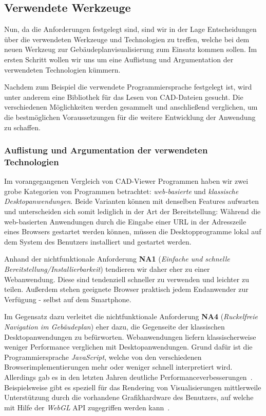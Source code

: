 \subsection{Verwendete Werkzeuge}
\label{subsec:used-tools}

Nun, da die Anforderungen festgelegt sind, sind wir in der Lage Entscheidungen über die verwendeten Werkzeuge und Technologien zu treffen, welche bei dem neuen Werkzeug zur Gebäudeplanvisualisierung zum Einsatz kommen sollen.
Im ersten Schritt wollen wir uns um eine Auflistung und Argumentation der verwendeten Technologien kümmern.

Nachdem zum Beispiel die verwendete Programmiersprache festgelegt ist, wird unter anderem eine Bibliothek für das Lesen von CAD-Dateien gesucht.
Die verschiedenen Möglichkeiten werden gesammelt und anschließend verglichen, um die bestmöglichen Voraussetzungen für die weitere Entwicklung der Anwendung zu schaffen.

\subsubsection{Auflistung und Argumentation der verwendeten Technologien}
\label{subsec:collection-tools}

Im vorangegangenen Vergleich von CAD-Viewer Programmen haben wir zwei grobe Kategorien von Programmen betrachtet: \textit{web-basierte} und \textit{klassische Desktopanwendungen}.
Beide Varianten können mit denselben Features aufwarten und unterscheiden sich somit lediglich in der Art der Bereitstellung:
Während die web-basierten Anwendungen durch die Eingabe einer URL in der Adresszeile eines Browsers gestartet werden können, müssen die Desktopprogramme lokal auf dem System des Benutzers installiert und gestartet werden.

Anhand der nichtfunktionale Anforderung \textbf{NA1} (\textit{Einfache und schnelle Bereitstellung/Installierbarkeit}) tendieren wir daher eher zu einer Webanwendung.
Diese sind tendenziell schneller zu verwenden und leichter zu teilen.
Außerdem stehen geeignete Browser praktisch jedem Endanwender zur Verfügung - selbst auf dem Smartphone.

Im Gegensatz dazu verleitet die nichtfunktionale Anforderung \textbf{NA4} (\textit{Ruckelfreie Navigation im Gebäudeplan}) eher dazu, die Gegenseite der klassischen Desktopanwendungen zu befürworten.
Webanwendungen liefern klassischerweise weniger Performance verglichen mit Desktopanwendungen.
Grund dafür ist die Programmiersprache \textit{JavaScript}, welche von den verschiedenen Browserimplementierungen mehr oder weniger schnell interpretiert wird.
Allerdings gab es in den letzten Jahren deutliche Performanceverbesserungen~\cite{WebAppMolecular}.
Beispielsweise gibt es speziell für das Rendering von Visualisierungen mittlerweile Unterstützung durch die vorhandene Grafikhardware des Benutzers, auf welche mit Hilfe der \textit{WebGL} API zugegriffen werden kann~\cite{WebAppMolecular}.

